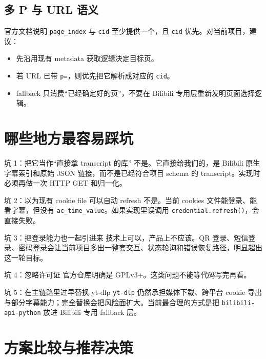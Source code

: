 \documentclass[a4paper]{article}
\begin{document}
\subsection{多 P 与 URL 语义}

官方文档说明 \texttt{page\_index} 与 \texttt{cid} 至少提供一个，且 \texttt{cid} 优先。对当前项目，建议：
\begin{itemize}
\item 先沿用现有 metadata 获取逻辑决定目标页。
\item 若 URL 已带 \texttt{p=}，则优先把它解析成对应的 \texttt{cid}。
\item fallback 只消费“已经确定好的页”，不要在 Bilibili 专用层重新发明页面选择逻辑。
\end{itemize}

\section{哪些地方最容易踩坑}

\begin{riskbox}{坑 1：把它当作“直接拿 transcript 的库”}
不是。它直接给我们的，是 Bilibili 原生字幕索引和原始 JSON 链接，而不是已经符合项目 schema 的 transcript。实现时必须再做一次 HTTP GET 和归一化。
\end{riskbox}

\begin{riskbox}{坑 2：以为现有 cookie file 可以自动 refresh}
不是。当前 cookies 文件能登录、能看字幕，但没有 \texttt{ac\_time\_value}。如果实现里误调用 \texttt{credential.refresh()}，会直接失败。
\end{riskbox}

\begin{riskbox}{坑 3：把登录能力也一起引进来}
技术上可以，产品上不应该。QR 登录、短信登录、密码登录会让当前项目多出一整套交互、状态轮询和错误恢复路径，明显超出这一轮目标。
\end{riskbox}

\begin{riskbox}{坑 4：忽略许可证}
官方仓库明确是 GPLv3+。这类问题不能等代码写完再看。
\end{riskbox}

\begin{riskbox}{坑 5：在主链路里过早替换 yt-dlp}
\texttt{yt-dlp} 仍然承担媒体下载、跨平台 cookie 导出与部分字幕能力；完全替换会把风险面扩大。当前最合理的方式是把 \texttt{bilibili-api-python} 放进 Bilibili 专用 fallback 层。
\end{riskbox}

\section{方案比较与推荐决策}
\end{document}
